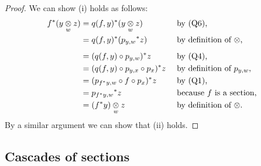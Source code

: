 \begin{proof}
We can show (i) holds as follows: 
\begin{align*}
f^*(\yz) &= q(f,y)^*(\yz)                           &&\mbox{ by (Q6),}                \\
          &= q(f,y)^*({p_{y,w}} ^* z)               &&\mbox{ by definition of $\crossx{}{}{}$,}              \\
          &= (q(f,y)\circ p_{y,w}) ^* z             &&\mbox{ by (Q4),}                         \\
          &= (q(f,y) \circ p_{y,x} \circ p_x ) ^* z &&\mbox{ by definition of $p_{y,w}$,}      \\
          &= (p_{f^*y,w} \circ f \circ p_x ) ^* z   &&\mbox{ by (Q1),} \\
          &= {p_{f^*y,w}}^*z                        &&\mbox{ because $f$ is a section,}                   \\
          &= \crossx{(f^*y)}{z}{w}                  &&\mbox{ by definition of $\crossx{}{}{}$.}
\end{align*}
By a similar argument we can show that (ii) holds. 
\end{proof}





\subsection{Cascades of sections}




